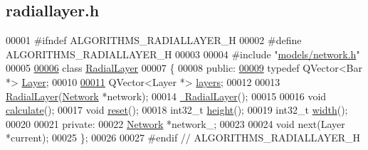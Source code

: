 \hypertarget{radiallayer_8h_source}{}\subsection{radiallayer.\+h}
\label{radiallayer_8h_source}

\begin{DoxyCode}
00001 \textcolor{preprocessor}{#ifndef ALGORITHMS\_RADIALLAYER\_H}
00002 \textcolor{preprocessor}{#define ALGORITHMS\_RADIALLAYER\_H}
00003 
00004 \textcolor{preprocessor}{#include "\hyperlink{network_8h}{models/network.h}"}
00005 
\hypertarget{radiallayer_8h_source_l00006}{}\hyperlink{class_radial_layer}{00006} \textcolor{keyword}{class }\hyperlink{class_radial_layer}{RadialLayer}
00007 \{
00008 \textcolor{keyword}{public}:
\hypertarget{radiallayer_8h_source_l00009}{}\hyperlink{class_radial_layer_a65d67f20b05dd45f90ec4252376807b2}{00009}   \textcolor{keyword}{typedef} QVector<Bar *> \hyperlink{class_radial_layer_a65d67f20b05dd45f90ec4252376807b2}{Layer};
00010   
\hypertarget{radiallayer_8h_source_l00011}{}\hyperlink{class_radial_layer_a714c36b1ab50a7778953e924ddac2787}{00011}   QVector<Layer *> \hyperlink{class_radial_layer_a714c36b1ab50a7778953e924ddac2787}{layers};
00012 
00013   \hyperlink{class_radial_layer_aed5c263337bbfc88538eeab76ce9843c}{RadialLayer}(\hyperlink{class_network}{Network} *network);
00014   \hyperlink{class_radial_layer_aa862e21e30909caf8b08e10128efd509}{~RadialLayer}();
00015   
00016   \textcolor{keywordtype}{void} \hyperlink{class_radial_layer_a971680f24ba6c516afedbc49d8c22cab}{calculate}();
00017   \textcolor{keywordtype}{void} \hyperlink{class_radial_layer_ad7c22136680fe3b188ae023dd619a30f}{reset}();
00018   int32\_t \hyperlink{class_radial_layer_a16baa7c0de325df193117752161b0974}{height}();
00019   int32\_t \hyperlink{class_radial_layer_ae8b32d0711cc6f4dbec832bb07d59a49}{width}();
00020 
00021 \textcolor{keyword}{private}:
00022   \hyperlink{class_network}{Network} *network\_;
00023   
00024   \textcolor{keywordtype}{void} next(Layer *current);
00025 \};
00026 
00027 \textcolor{preprocessor}{#endif // ALGORITHMS\_RADIALLAYER\_H}
\end{DoxyCode}
